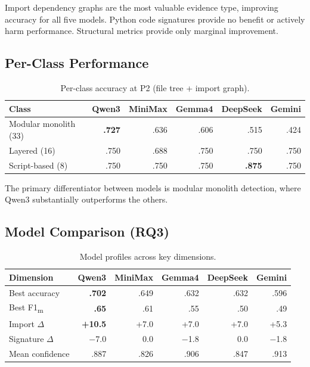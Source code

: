 \documentclass[runningheads]{llncs}
\begin{document}
Import dependency graphs are the most valuable evidence type, improving accuracy for all five models. Python code signatures provide no benefit or actively harm performance. Structural metrics provide only marginal improvement.

\subsection{Per-Class Performance}

\begin{table}[htbp]
\caption{Per-class accuracy at P2 (file tree + import graph).}
\label{tab:per_class}
\centering
\small
\begin{tabular}{lrrrrr}
\toprule
\textbf{Class} & \textbf{Qwen3} & \textbf{MiniMax} & \textbf{Gemma4} & \textbf{DeepSeek} & \textbf{Gemini} \\
\midrule
Modular monolith (33) & \textbf{.727} & .636 & .606 & .515 & .424 \\
Layered (16)          & .750 & .688 & .750 & .750 & .750 \\
Script-based (8)      & .750 & .750 & .750 & \textbf{.875} & .750 \\
\bottomrule
\end{tabular}
\end{table}

The primary differentiator between models is modular monolith detection, where Qwen3 substantially outperforms the others.

\subsection{Model Comparison (RQ3)}

\begin{table}[htbp]
\caption{Model profiles across key dimensions.}
\label{tab:model_profiles}
\centering
\small
\begin{tabular}{lrrrrr}
\toprule
\textbf{Dimension} & \textbf{Qwen3} & \textbf{MiniMax} & \textbf{Gemma4} & \textbf{DeepSeek} & \textbf{Gemini} \\
\midrule
Best accuracy & \textbf{.702} & .649 & .632 & .632 & .596 \\
Best F1\textsubscript{m} & \textbf{.65} & .61 & .55 & .50 & .49 \\
Import $\Delta$ & \textbf{+10.5} & +7.0 & +7.0 & +7.0 & +5.3 \\
Signature $\Delta$ & $-$7.0 & 0.0 & $-$1.8 & 0.0 & $-$1.8 \\
Mean confidence & .887 & .826 & .906 & .847 & .913 \\
\bottomrule
\end{tabular}
\end{table}
\end{document}
